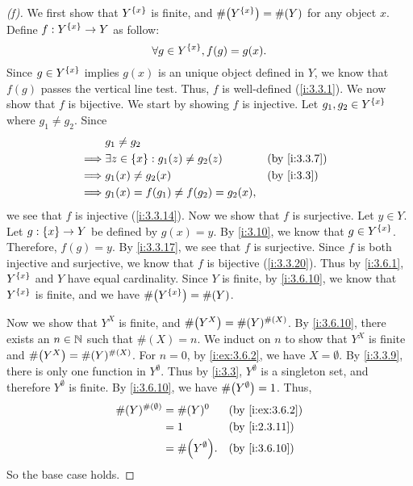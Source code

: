 \begin{proof}[(f)]
  We first show that \(Y^{\left\lbrace x\right\rbrace}\) is finite, and \(\#\pa{Y^{\set{x}}} = \#(Y)\) for any object \(x\).
  Define \(f : Y^{\left\lbrace x\right\rbrace} \to Y\) as follow:
  \[
    \forall g \in Y^{\left\lbrace x\right\rbrace}, f(g) = g(x).
  \]
  Since \(g \in Y^{\left\lbrace x\right\rbrace}\) implies \(g(x)\) is an unique object defined in \(Y\), we know that \(f(g)\) passes the vertical line test.
  Thus, \(f\) is well-defined (\cref{i:3.3.1}).
  We now show that \(f\) is bijective.
  We start by showing \(f\) is injective.
  Let \(g_1, g_2 \in Y^{\left\lbrace x\right\rbrace}\) where \(g_1 \neq g_2\).
  Since
  \begin{align*}
             & g_1 \neq g_2                                                 \\
    \implies & \exists z \in \set{x} : g_1(z) \neq g_2(z) &  & \by{i:3.3.7} \\
    \implies & g_1(x) \neq g_2(x)                         &  & \by{i:3.3}   \\
    \implies & g_1(x) = f(g_1) \neq f(g_2) = g_2(x),
  \end{align*}
  we see that \(f\) is injective (\cref{i:3.3.14}).
  Now we show that \(f\) is surjective.
  Let \(y \in Y\).
  Let \(g : \left\lbrace x\right\rbrace \to Y\) be defined by \(g(x) = y\).
  By \cref{i:3.10}, we know that \(g \in Y^{\left\lbrace x\right\rbrace}\).
  Therefore, \(f(g) = y\).
  By \cref{i:3.3.17}, we see that \(f\) is surjective.
  Since \(f\) is both injective and surjective, we know that \(f\) is bijective (\cref{i:3.3.20}).
  Thus by \cref{i:3.6.1}, \(Y^{\left\lbrace x\right\rbrace}\) and \(Y\) have equal cardinality.
  Since \(Y\) is finite, by \cref{i:3.6.10}, we know that \(Y^{\left\lbrace x\right\rbrace}\) is finite, and we have \(\#\pa{Y^{\set{x}}} = \#(Y)\).

  Now we show that \(Y^X\) is finite, and \(\#\pa{Y^X} = \#(Y)^{\#(X)}\).
  By \cref{i:3.6.10}, there exists an \(n \in \mathbb{N}\) such that \(\#(X) = n\).
  We induct on \(n\) to show that \(Y^X\) is finite and \(\#\pa{Y^X} = \#(Y)^{\#(X)}\).
  For \(n = 0\), by \cref{i:ex:3.6.2}, we have \(X = \emptyset\).
  By \cref{i:3.3.9}, there is only one function in \(Y^\emptyset\).
  Thus by \cref{i:3.3}, \(Y^\emptyset\) is a singleton set, and therefore \(Y^\emptyset\) is finite.
  By \cref{i:3.6.10}, we have \(\#\pa{Y^\emptyset} = 1\).
  Thus,
  \begin{align*}
    \#(Y)^{\#(\emptyset)} & = \#(Y)^0             &  & \by{i:ex:3.6.2} \\
                          & = 1                   &  & \by{i:2.3.11}   \\
                          & = \#\pa{Y^\emptyset}. &  & \by{i:3.6.10}
  \end{align*}
  So the base case holds.


\end{proof}
